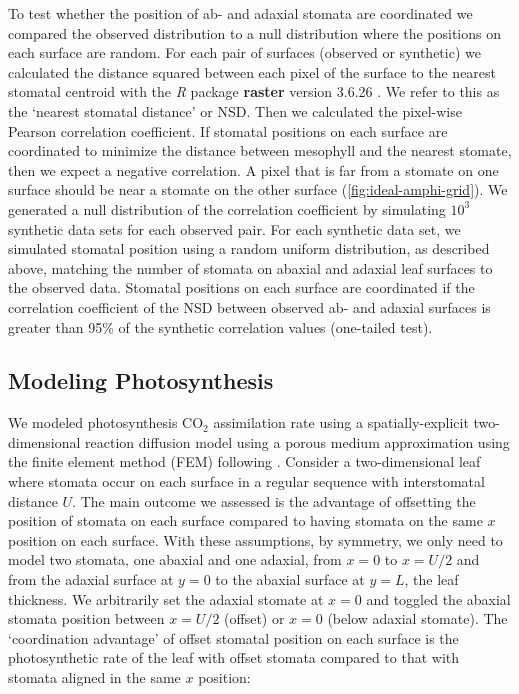 \documentclass[webpdf,large,modern,unnumsec,namedate]{oup-authoring-template}
\begin{document}
To test whether the position of ab- and adaxial stomata are coordinated
we compared the observed distribution to a null distribution where the
positions on each surface are random. For each pair of surfaces
(observed or synthetic) we calculated the distance squared between each
pixel of the surface to the nearest stomatal centroid with the \emph{R}
package \textbf{raster} version 3.6.26 \citep{hijmans_raster_2023}. We
refer to this as the `nearest stomatal distance' or NSD. Then we
calculated the pixel-wise Pearson correlation coefficient. If stomatal
positions on each surface are coordinated to minimize the distance
between mesophyll and the nearest stomate, then we expect a negative
correlation. A pixel that is far from a stomate on one surface should be
near a stomate on the other surface (\autoref{fig:ideal-amphi-grid}). We
generated a null distribution of the correlation coefficient by
simulating \(10^3\) synthetic data sets for each observed pair. For each
synthetic data set, we simulated stomatal position using a random
uniform distribution, as described above, matching the number of stomata
on abaxial and adaxial leaf surfaces to the observed data. Stomatal
positions on each surface are coordinated if the correlation coefficient
of the NSD between observed ab- and adaxial surfaces is greater than
95\% of the synthetic correlation values (one-tailed test).

\subsection{Modeling Photosynthesis}\label{modeling-photosynthesis}

We modeled photosynthesis CO\(_2\) assimilation rate using a
spatially-explicit two-dimensional reaction diffusion model using a
porous medium approximation \citep{parkhurst_diffusion_1994} using the
finite element method (FEM) following \citet{earles_excess_2017}.
Consider a two-dimensional leaf where stomata occur on each surface in a
regular sequence with interstomatal distance \(U\). The main outcome we
assessed is the advantage of offsetting the position of stomata on each
surface compared to having stomata on the same \(x\) position on each
surface. With these assumptions, by symmetry, we only need to model two
stomata, one abaxial and one adaxial, from \(x = 0\) to \(x = U/2\) and
from the adaxial surface at \(y = 0\) to the abaxial surface at
\(y = L\), the leaf thickness. We arbitrarily set the adaxial stomate at
\(x = 0\) and toggled the abaxial stomata position between \(x = U/2\)
(offset) or \(x = 0\) (below adaxial stomate). The `coordination
advantage' of offset stomatal position on each surface is the
photosynthetic rate of the leaf with offset stomata compared to that
with stomata aligned in the same \(x\) position:
\end{document}
